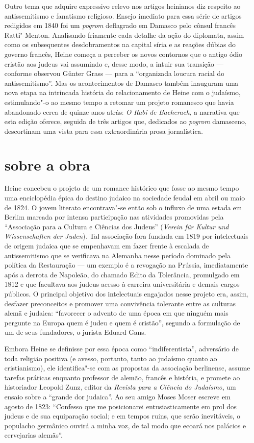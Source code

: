 Outro tema que adquire expressivo relevo nos artigos heinianos diz
respeito ao antissemitismo e fanatismo religioso. Ensejo imediato
para essa série de artigos redigidos em 1840 foi um \textit{pogrom}
deflagrado em Damasco pelo cônsul francês Ratti"-Menton. Analisando
friamente cada detalhe da ação do diplomata, assim como os subsequentes
desdobramentos na capital síria e as reações dúbias do governo francês,
Heine começa a perceber os novos contornos que o antigo ódio cristão
aos judeus vai assumindo e, desse modo, a intuir sua transição ---
conforme observou Günter Grass --- para a “organizada loucura racial do
antissemitismo”. Mas os acontecimentos de Damasco também inauguram
uma nova etapa na intrincada história do relacionamento de Heine com o
judaísmo, estimulando"-o ao mesmo tempo a retomar um projeto romanesco
que havia abandonado cerca de quinze anos atrás: \textit{O Rabi de
Bacherach}, a narrativa que esta edição oferece,
seguida de três artigos que,
dedicados ao \textit{pogrom} damasceno, descortinam uma vista para essa
extraordinária prosa jornalística.

\section{sobre a obra}

Heine concebeu o projeto de um romance histórico que fosse ao mesmo
tempo uma enciclopédia épica do destino judaico na sociedade feudal em
abril ou maio de 1824. O jovem literato encontrava"-se então sob o
influxo de uma estada em Berlim marcada por intensa participação nas
atividades promovidas pela “Associação para a Cultura e Ciências dos
Judeus” (\textit{Verein für Kultur und Wissenschaften der Juden}). Tal
associação fora fundada em 1819 por intelectuais de origem judaica que
se empenhavam em fazer frente à escalada de antissemitismo que se
verificava na Alemanha nesse período dominado pela política da
Restauração --- um exemplo é a revogação na Prússia, imediatamente após a
derrota de Napoleão, do chamado Edito da Tolerância, promulgado em 1812
e que facultava aos judeus acesso à carreira universitária e demais
cargos públicos. O principal objetivo dos intelectuais engajados nesse
projeto era, assim, desfazer preconceitos e promover uma convivência
tolerante entre as culturas alemã e judaica: “favorecer o advento de
uma época em que ninguém mais pergunte na Europa quem é judeu e quem é
cristão”, segundo a formulação de um de seus fundadores, o jurista
Eduard Gans.

Embora Heine se definisse por essa época como “indiferentista”,
adversário de toda religião positiva (e avesso, portanto, tanto ao
judaísmo quanto ao cristianismo), ele identifica"-se com as propostas
da associação berlinense, assume tarefas práticas enquanto professor de
alemão, francês e história, e promete ao historiador Leopold Zunz,
editor da \textit{Revista para a Ciência do Judaísmo}, um ensaio sobre
a “grande dor judaica”. Ao seu amigo Moses Moser escreve em agosto de
1823: “Confesso que me posicionarei entusiasticamente em prol dos
judeus e de sua equiparação social; e em tempos ruins, que serão
inevitáveis, o populacho germânico ouvirá a minha voz, de tal modo que
ecoará nos palácios e cervejarias alemãs”.

